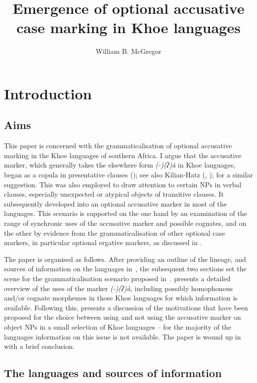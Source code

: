 \documentclass[output=paper]{LSP/langsci}
\author{William B. McGregor\affiliation{Aarhus University}
}
\title{Emergence of optional accusative case marking in Khoe languages}
\begin{document}
\section{Introduction}
\label{09-mc-sec:1}
\subsection{Aims}
\label{09-mc-sec:1-1}


This paper is concerned with the grammaticalisation of optional accusative marking in the Khoe languages of southern Africa. I argue that the accusative marker, which generally takes the elsewhere form \textit{(-)(ʔ)à} in Khoe languages, began as a copula in presentative clauses (\citealt[90–91, 307–310]{McGregor1997Semiotic}); see also Kilian-Hatz (\citeyear[55]{Kilian-Hatz2008Grammar}, \citeyear[376–377]{Kilian-Hatz2013Kxoe}); \citet[276]{Koenig2008Case} for a similar suggestion. This was also employed to draw attention to certain NPs in verbal clauses, especially unexpected or atypical objects of transitive clauses. It subsequently developed into an optional accusative marker in most of the languages. This scenario is supported on the one hand by an examination of the range of synchronic uses of the accusative marker and possible cognates, and on the other by evidence from the grammaticalisation of other optional case markers, in particular optional ergative markers, as discussed in \citet{McGregor2008Indexicals,McGregor2010Optional,McGregor2013Optionality}.

The paper is organised as follows. After providing an outline of the lineage, and sources of information on the languages in~, the subsequent two sections set the scene for the grammaticalisation scenario proposed in~.  presents a detailed overview of the uses of the marker \textit{(-)(ʔ)à}, including possibly homophonous and/or cognate morphemes in those Khoe languages for which information is available. Following this,  presents a discussion of the motivations that have been proposed for the choice between using and not using the accusative marker on object NPs in a small selection of Khoe languages – for the majority of the languages information on this issue is not available. The paper is wound up in~ with a brief conclusion.

\subsection{The languages and sources of information} \label{09-mc-sec:1-2}
\end{document}
